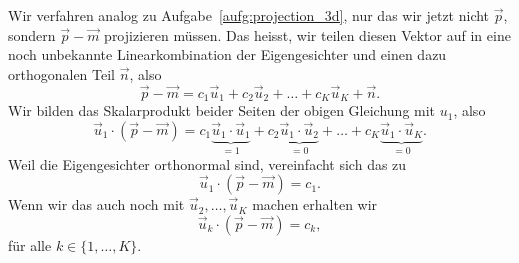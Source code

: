 \begin{losung}
	Wir verfahren analog zu Aufgabe~\ref{aufg:projection_3d}, nur das wir jetzt nicht $\vec{p}$, sondern $\vec p-\vec m$ projizieren müssen.
	Das heisst, wir teilen diesen Vektor auf in eine noch unbekannte Linearkombination der Eigengesichter und einen dazu orthogonalen Teil $\vec{n}$, also
	\begin{equation*}
		\vec p-\vec m=c_1\vec u_1+c_2\vec u_2+\ldots+c_K\vec u_K+\vec{n}.
	\end{equation*}
	Wir bilden das Skalarprodukt beider Seiten der obigen Gleichung mit $u_1$, also
	\begin{equation*}
		\vec u_1\cdot\left(\vec p-\vec m\right)=c_1\underbrace{\vec u_1\cdot\vec u_1}_{=1}+c_2\underbrace{\vec u_1\cdot\vec u_2}_{=0}+\ldots+c_K\underbrace{\vec u_1\cdot\vec u_K}_{=0}.
	\end{equation*}
	Weil die Eigengesichter orthonormal sind, vereinfacht sich das zu
	\begin{equation*}
		\vec u_1\cdot\left(\vec p-\vec m\right)=c_1.
	\end{equation*}
	Wenn wir das auch noch mit $\vec u_2,\ldots,\vec u_K$ machen erhalten wir
	\begin{equation*}
		\vec u_k\cdot\left(\vec p-\vec m\right)=c_k,
	\end{equation*}
	für alle $k\in\{1,\ldots,K\}$.
\end{losung}

